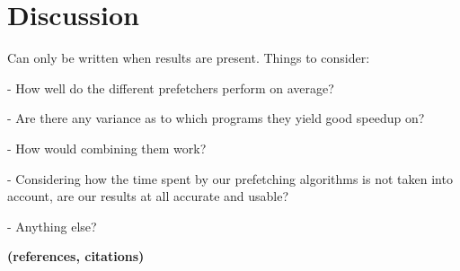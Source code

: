 
\section{Discussion} %
\label{sec:discussion}

Can only be written when results are present.
Things to consider:

- How well do the different prefetchers perform on average?

- Are there any variance as to which programs they yield good speedup
on?

- How would combining them work?

- Considering how the time spent by our prefetching algorithms is not
taken into account, are our results at all accurate and usable?

- Anything else?

{\bf (references, citations)}
